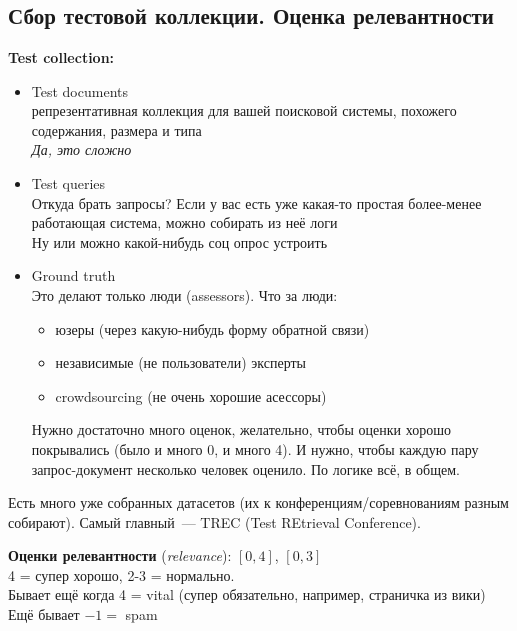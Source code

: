 \documentclass[12pt]{article}
\begin{document}
\pagebreak %

\section{} %

  \subsection{Сбор тестовой коллекции. Оценка релевантности}
    {\bf Test collection:}
      \begin{itemize}
        \item Test documents\\
          репрезентативная коллекция для вашей поисковой системы, похожего содержания, размера и типа\\
          \textit{Да, это сложно}
        \item Test queries\\
          Откуда брать запросы? Если у вас есть уже какая-то простая более-менее работающая система, можно собирать из неё логи\\
          Ну или можно какой-нибудь соц опрос устроить
        \item Ground truth\\
          Это делают только люди (assessors). Что за люди:
            \begin{itemize}
                \item юзеры (через какую-нибудь форму обратной связи)
                \item независимые (не пользователи) эксперты
                \item crowdsourcing (не очень хорошие асессоры) 
            \end{itemize}
          Нужно достаточно много оценок, желательно, чтобы оценки хорошо покрывались (было и много 0, и много 4). И нужно, чтобы каждую пару запрос-документ несколько человек оценило. По логике всё, в общем.
      \end{itemize}
      Есть много уже собранных датасетов (их к конференциям/соревнованиям разным собирают). Самый главный~--- TREC (Test REtrieval Conference).

      \smallskip\smallskip
      {\bf Оценки релевантности} (\textit{relevance}): $[0, 4]$, $[0, 3]$\\
      4 = супер хорошо, 2-3 = нормально.\\
      Бывает ещё когда 4 = vital (супер обязательно, например, страничка из вики)\\
      Ещё бывает $-1 = $ spam
\end{document}

